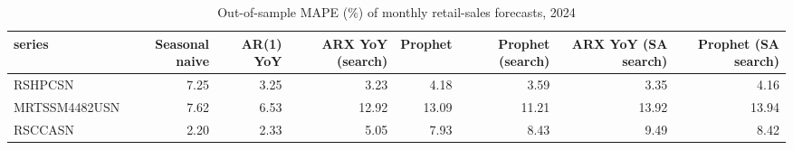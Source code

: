 \begin{table}[t]
\scriptsize
\centering
\caption{Out-of-sample MAPE (\%) of monthly retail-sales forecasts, 2024}
\label{tab:forecast_monthly}
\begin{tabular}{lrrrrrrr}
\toprule
series & Seasonal naive & AR(1) YoY & ARX YoY (search) & Prophet & Prophet (search) & ARX YoY (SA search) & Prophet (SA search) \\
\midrule
RSHPCSN & 7.25 & 3.25 & 3.23 & 4.18 & 3.59 & 3.35 & 4.16 \\
MRTSSM4482USN & 7.62 & 6.53 & 12.92 & 13.09 & 11.21 & 13.92 & 13.94 \\
RSCCASN & 2.20 & 2.33 & 5.05 & 7.93 & 8.43 & 9.49 & 8.42 \\
\bottomrule
\end{tabular}
\end{table}
